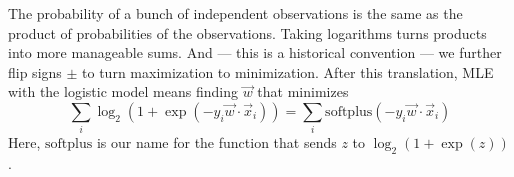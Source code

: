

        The probability of a bunch of independent observations is the same as
        the product of probabilities of the observations.  Taking logarithms
        turns products into more manageable sums.  And --- this is a historical
        convention --- we further flip signs $\pm$ to turn maximization to
        minimization.
        After this translation, MLE with the logistic model means finding $\vec
        w$ that minimizes
        $$
          \sum_i \log_2(1+\exp(-y_i\vec w\cdot \vec x_i))
          =
          \sum_i \text{softplus}(-y_i\vec w\cdot \vec x_i)
        $$
        Here, $\text{softplus}$ is our name for the function that sends
        $z$ to $\log_2(1+\exp(z))$.



